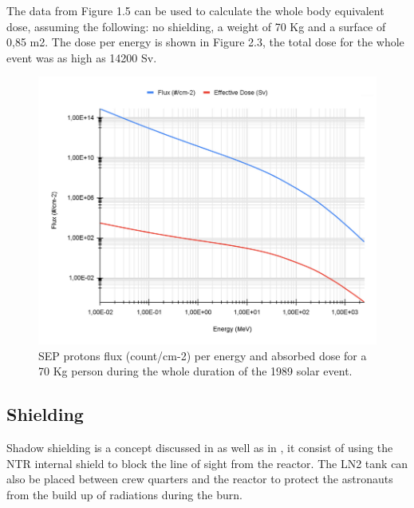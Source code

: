 \documentclass[12pt,a4paper]{report}
\begin{document}
The data from Figure 1.5 can be used to calculate the whole body equivalent dose, assuming the following: no shielding, a weight of 70 Kg and a surface of 0,85 m2. The dose per energy is shown in Figure 2.3, the total dose for the whole event was as high as 14200 Sv.

\begin{figure}[hbtp]
\centering
\includegraphics[width=.8\textwidth]{img/ED 1989.png}
\caption{SEP protons flux (count/cm-2) per energy and absorbed dose for a 70 Kg person during the whole duration of the 1989 solar event.}
\end{figure}

\subsection{Shielding}


Shadow shielding is a concept discussed in \citet{mclaren2010} as well as in \citet{hoffman1997}, it consist of using the NTR internal shield to block the line of sight from the reactor. The LN2 tank can also be placed between crew quarters and the reactor to protect the astronauts from the build up of radiations during the burn.\\
\end{document}
